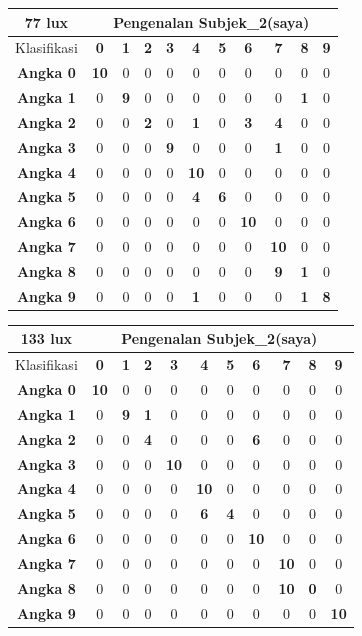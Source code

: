 \begin{tabular}{|c|c|c|c|c|c|c|c|c|c|c|}
	\hline 77 lux
	& \multicolumn{10}{|c|}{Pengenalan Subjek\_2(saya)} \\
	\hline  Klasifikasi&\textbf{0} &\textbf{1} &\textbf{2} &\textbf{3} &\textbf{4}&\textbf{5} &\textbf{6}&\textbf{7}&\textbf{8}&\textbf{9}\\
	\hline \textbf{Angka 0} &\textbf{10} &0 &0 &0 &0 &0 &0 &0 &0 &0\\
	\hline \textbf{Angka 1} &0 &\textbf{9} &0 &0 &0 &0 &0 &0 &\textbf{1} &0\\
	\hline \textbf{Angka 2} &0 &0 &\textbf{2} &0 &\textbf{1}&0 &\textbf{3} &\textbf{4} &0 &0\\
	\hline \textbf{Angka 3} &0 &0 &0 &\textbf{9} &0 &0 &0 &\textbf{1} &0 &0\\
	\hline \textbf{Angka 4} &0 &0 &0 &0 &\textbf{10} &0 &0 &0 &0 &0\\
	\hline \textbf{Angka 5} &0 &0 &0 &0 &\textbf{4} &\textbf{6} &0 &0 &0 &0 \\
	\hline \textbf{Angka 6} &0 &0 &0 &0 &0 &0 &\textbf{10} &0 &0 &0\\
	\hline \textbf{Angka 7} &0 &0 &0 &0 &0 &0 &0 &\textbf{10} &0 &0\\
	\hline \textbf{Angka 8} &0 &0 &0 &0 &0 &0 &0 &\textbf{9} &\textbf{1} &0 \\
	\hline \textbf{Angka 9} &0 &0 &0 &0 &\textbf{1} &0 &0 &0 &\textbf{1} &\textbf{8} \\
	\hline
\end{tabular}

\begin{tabular}{|c|c|c|c|c|c|c|c|c|c|c|}
	\hline 133 lux
	& \multicolumn{10}{|c|}{Pengenalan Subjek\_2(saya)} \\
	\hline  Klasifikasi&\textbf{0} &\textbf{1} &\textbf{2} &\textbf{3} &\textbf{4}&\textbf{5} &\textbf{6}&\textbf{7}&\textbf{8}&\textbf{9}\\
	\hline \textbf{Angka 0} &\textbf{10} &0 &0 &0 &0 &0 &0 &0 &0 &0\\
	\hline \textbf{Angka 1} &0 &\textbf{9} &\textbf{1} &0 &0 &0 &0 &0 &0 &0\\
	\hline \textbf{Angka 2} &0 &0 &\textbf{4} &0 &0 &0 &\textbf{6} &0 &0 &0\\
	\hline \textbf{Angka 3} &0 &0 &0 &\textbf{10} &0 &0 &0 &0 &0 &0\\
	\hline \textbf{Angka 4} &0 &0 &0 &0 &\textbf{10} &0 &0 &0 &0 &0\\
	\hline \textbf{Angka 5} &0 &0 &0 &0 &\textbf{6} &\textbf{4} &0 &0 &0 &0 \\
	\hline \textbf{Angka 6} &0 &0 &0 &0 &0 &0 &\textbf{10} &0 &0 &0\\
	\hline \textbf{Angka 7} &0 &0 &0 &0 &0 &0 &0 &\textbf{10} &0 &0\\
	\hline \textbf{Angka 8} &0 &0 &0 &0 &0 &0 &0 &\textbf{10} &\textbf{0} &0 \\
	\hline \textbf{Angka 9} &0 &0 &0 &0 &0 &0 &0 &0 &0 &\textbf{10} \\
	\hline
\end{tabular}

